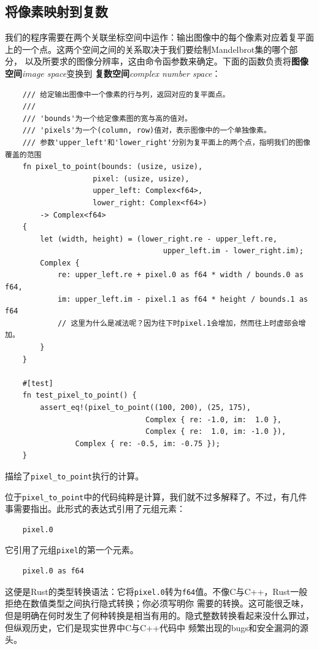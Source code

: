 \subsection{将像素映射到复数}
我们的程序需要在两个关联坐标空间中运作：输出图像中的每个像素对应着复平面上的一个点。这两个空间之间的关系取决于我们要绘制Mandelbrot集的哪个部分，
以及所要求的图像分辨率，这由命令函参数来确定。下面的函数负责将\textbf{图像空间}\textit{image space}变换到
\textbf{复数空间}\textit{complex number space}：
\begin{verbatim}
    /// 给定输出图像中一个像素的行与列，返回对应的复平面点。
    /// 
    /// 'bounds'为一个给定像素图的宽与高的值对。
    /// 'pixels'为一个(column, row)值对，表示图像中的一个单独像素。
    /// 参数'upper_left'和'lower_right'分别为复平面上的两个点，指明我们的图像覆盖的范围
    fn pixel_to_point(bounds: (usize, usize),
                    pixel: (usize, usize),
                    upper_left: Complex<f64>,
                    lower_right: Complex<f64>) 
        -> Complex<f64>
    {
        let (width, height) = (lower_right.re - upper_left.re,
                                    upper_left.im - lower_right.im);
        Complex {
            re: upper_left.re + pixel.0 as f64 * width / bounds.0 as f64,
            im: upper_left.im - pixel.1 as f64 * height / bounds.1 as f64
            // 这里为什么是减法呢？因为往下时pixel.1会增加，然而往上时虚部会增加。
        }
    }

    #[test]
    fn test_pixel_to_point() {
        assert_eq!(pixel_to_point((100, 200), (25, 175), 
                                Complex { re: -1.0, im:  1.0 },
                                Complex { re:  1.0, im: -1.0 }),
                Complex { re: -0.5, im: -0.75 });
    }
\end{verbatim}

\smallskip
{} 描绘了\texttt{pixel\_to\_point}执行的计算。

\medskip
位于\texttt{pixel\_to\_point}中的代码纯粹是计算，我们就不过多解释了。不过，有几件事需要指出。此形式的表达式引用了元组元素：
\begin{verbatim}
    pixel.0
\end{verbatim}

\smallskip
它引用了元组\texttt{pixel}的第一个元素。
\begin{verbatim}
    pixel.0 as f64
\end{verbatim}

\smallskip
这便是Rust的类型转换语法：它将\texttt{pixel.0}转为\texttt{f64}值。不像C与C++，Rust一般拒绝在数值类型之间执行隐式转换；你必须写明你
需要的转换。这可能很乏味，但是明确在何时发生了何种转换是相当有用的。隐式整数转换看起来没什么罪过，但纵观历史，它们是现实世界中C与C++代码中
频繁出现的bugs和安全漏洞的源头。

